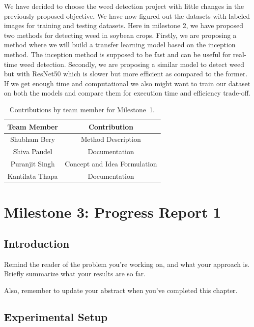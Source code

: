 \documentclass{report}
\begin{document}
We have decided to choose the weed detection project with little changes in the previously proposed objective. We have now figured out the datasets with labeled images for training and testing datasets. Here in milestone 2, we have proposed two methods for detecting weed in soybean crops. Firstly, we are proposing a method where we will build a transfer learning model based on the inception method. The inception method is supposed to be fast and can be useful for real-time weed detection. Secondly, we are proposing a similar model to detect weed but with ResNet50 which is slower but more efficient as compared to the former. If we get enough time and computational we also might want to train our dataset on both the models and compare them for execution time and efficiency trade-off.

\begin{table}[h]
    \caption{Contributions by team member for Milestone~1.}
    \centering
    \begin{tabular}{|c|c|} \hline
    {\bf Team Member}     &  {\bf Contribution}  \\ \hline
    Shubham Bery     & Method Description \\
    Shiva Paudel    & Documentation\\
    Puranjit Singh     & Concept and Idea Formulation \\
    Kantilata Thapa     & Documentation \\ \hline
    \end{tabular}
    \label{tab:contribution1}
\end{table}

\iffalse
\chapter{Milestone 3: Progress Report 1}

\section{Introduction}
\label{sec:M3-intro}

Remind the reader of the problem you're working on, and what your approach is.  Briefly summarize what your results are so far.

Also, remember to update your abstract when you've completed this chapter.

\section{Experimental Setup}
\label{sec:M3-setup}
\end{document}
